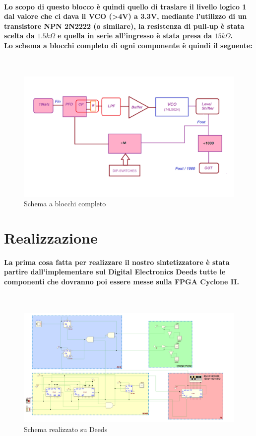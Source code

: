\documentclass{article}
\begin{document}
\paragraph{Lo scopo di questo blocco è quindi quello di traslare il livello logico 1 dal valore che ci dava il VCO (\textgreater 4V) a 3.3V, mediante l'utilizzo di un transistore NPN 2N2222 (o similare), la resistenza di pull-up è stata scelta da $1.5k\Omega$ e quella in serie all'ingresso è stata presa da $15k\Omega$.\\
Lo schema a blocchi completo di ogni componente è quindi il seguente:}
~\begin{figure}[!h]%
\includegraphics[scale=0.4]{PLL_1.png} 
\centering
\caption{Schema a blocchi completo}
\label{fig:foo}
\end{figure}


\newpage
\section{Realizzazione}
\paragraph{La prima cosa fatta per realizzare il nostro sintetizzatore è stata partire dall'implementare sul Digital Electronics Deeds tutte le componenti che dovranno poi essere messe sulla FPGA Cyclone II.}
~\begin{figure}[!h]%
\includegraphics[scale=4.4]{Fig_Finale.png} 
\centering
\caption{Schema realizzato su Deeds}
\label{fig:foo}
\end{figure}
\end{document}
